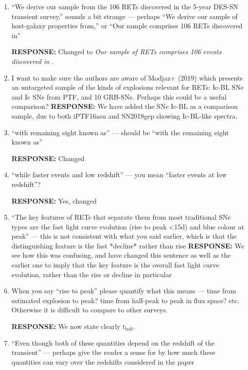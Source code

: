 \documentclass{article}
\begin{document}
\begin{enumerate}
    \item “We derive our sample from the 106 RETs discovered in the 5-year DES-SN transient survey.” sounds a bit strange — perhaps “We derive our sample of host-galaxy properties from,” or “Our sample comprises 106 RETs discovered in”
    
    \vskip0.1cm
{\bf RESPONSE: }
Changed to \textit{Our sample of RETs comprises 106 events discovered in }.

\item I want to make sure the authors are aware of Modjaz+ (2019) which presents an untargeted sample of the kinds of explosions relevant for RETs: Ic-BL SNe and Ic SNe from PTF, and 10 GRB-SNe. Perhaps this could be a useful comparison?
\vskip0.1cm
{\bf RESPONSE: } We have added the SNe Ic-BL as a comparison sample, due to both iPTF16asu and SN2018gep showing Ic-BL-like spectra. 

\item “with remaining eight known as” — should be “with the remaining eight known as”

\vskip0.1cm
{\bf RESPONSE: } Changed

\item “while faster events and low redshift” — you mean “faster events at low redshift”?

\vskip0.1cm
{\bf RESPONSE: } Yes, changed

\item “The key features of RETs that separate them from most traditional SNe types are the fast light curve evolution (rise to peak <15d) and blue colour at peak” — this is not consistent with what you said earlier, which is that the distinguishing feature is the fast *decline* rather than rise
\vskip0.1cm
{\bf RESPONSE: } We see how this was confusing, and have changed this sentence as well as the earlier one to imply that the key feature is the overall fast light curve evolution, rather than the rise or decline in particular

\item When you say “rise to peak” please quantify what this means — time from estimated explosion to peak? time from half-peak to peak in flux space? etc. Otherwise it is difficult to compare to other surveys.

\vskip0.1cm
{\bf RESPONSE: } We now state clearly $t_\mathrm{half}$.

\item “Even though both of these quantities depend on the redshift of the transient” — perhaps give the reader a sense for by how much these quantities can vary over the redshifts considered in the paper


\end{enumerate}
\end{document}
